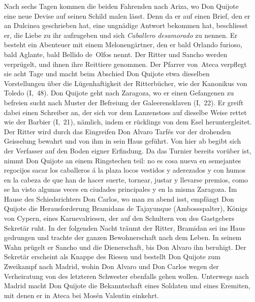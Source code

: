 Nach sechs Tagen kommen die beiden Fahrenden nach Ariza,
wo Don Quijote eine neue Devise auf seinen Schild malen lässt. Denn
da er auf einen Brief, den er an Dulcinea geschrieben hat, eine
ungnädige Antwort bekommen hat, beschliesst er, die Liebe zu ihr
aufzugeben und sich {\it\spanish Caballero desamorado} zu nennen. Er besteht ein
Abenteuer mit einem Melonengärtner, den er bald Orlando furioso,
bald Aglante, bald Bellido de~Olfos nennt. Der Ritter und Sancho
werden verprügelt, und ihnen ihre Reittiere genommen. Der Pfarrer
von~Ateca verpflegt sie acht Tage und macht beim Abschied Don
Quijote etwa dieselben Vorstellungen über die Lügenhaftigkeit der
Ritterbücher, wie der Kanonikus von Toledo (I,~48). Don Quijote geht
nach Zaragoza, wo er einen Gefangenen zu befreien sucht nach Muster
der Befreiung der Galeerensklaven (I,~22). Er greift dabei einen
Schreiber an, der sich vor dem Lanzenstoss auf dieselbe Weise rettet
wie der Barbier (I,~21), nämlich, indem er rücklings von dem Esel
heruntergleitet. Der Ritter wird durch das Eingreifen Don Alvaro Tarfés
vor der drohenden Geisselung bewahrt und von ihm in sein Haus
geführt. Von hier ab begibt sich der Verfasser auf den Boden
eigner Erfindung. Da das Turnier bereits vorüber ist, nimmt Don Quijote an
einem Ringstechen teil: {\itquoted\spanish no es cosa nueva en semejantes regocijos
sacar los caballeros á la plaza locos vestidos y aderezados y con humos
en la cabeza de que han de hacer suerte, tornear, justar y llevarse
premios, como se ha visto algunas veces en ciudades principales y en
la misma Zaragoza.} Im Hause des Schiedsrichters Don Carlos, wo
man zu abend isst, empfängt Don Quijote die Herausforderung Bramidans
de Tajayunque (Ambossspalter), Königs von Cypern, eines Karnevalriesen,
der auf den Schultern von des Gastgebers Sekretär ruht. In
der folgenden Nacht träumt der Ritter, Bramidan sei ins Haus gedrungen
und trachte der ganzen Bewohnerschaft nach dem Leben.
In seinem Wahn prügelt er Sancho und die Dienerschaft, bis Don
Alvaro ihn beruhigt. Der Sekretär erscheint als Knappe des Riesen
und bestellt Don Quijote zum Zweikampf nach Madrid, wohin Don
Alvaro und Don Carlos wegen der Verheiratung von des letzteren
Schwester ebenfalls gehen wollen. Unterwegs nach Madrid macht Don
Quijote die Bekanntschaft eines Soldaten und eines Eremiten, mit denen
er in Ateca bei Mosén Valentin einkehrt.

